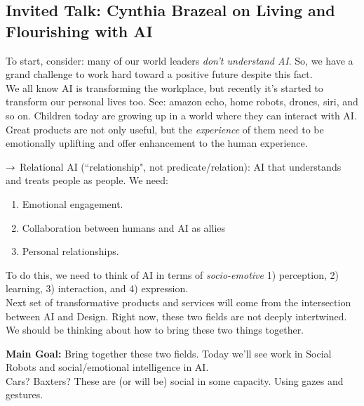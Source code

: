 \spacerule
\subsection{Invited Talk: Cynthia Brazeal on Living and Flourishing with AI}


To start, consider: many of our world leaders {\it don't understand AI}. So, we have a grand challenge to work hard toward a positive future despite this fact. \\

We all know AI is transforming the workplace, but recently it's started to transform our personal lives too. See: amazon echo, home robots, drones, siri, and so on. Children today are growing up in a world where they can interact with AI. \\

Great products are not only useful, but the {\it experience} of them need to be emotionally uplifting and offer enhancement to the human experience. \\


$\rightarrow$ Relational AI (``relationship", not predicate/relation): AI that understands and treats people as people. We need:
\begin{enumerate}
    \item Emotional engagement.
    \item Collaboration between humans and AI as allies
    \item Personal relationships. \\
\end{enumerate}

To do this, we need to think of AI in terms of {\it socio-emotive} 1) perception, 2) learning, 3) interaction, and 4) expression. \\

Next set of transformative products and services will come from the intersection between AI and Design. Right now, these two fields are not deeply intertwined. We should be thinking about how to bring these two things together.

{\bf Main Goal:} Bring together these two fields. Today we'll see work in Social Robots and social/emotional intelligence in AI. \\

Cars? Baxters? These are (or will be) social in some capacity. Using gazes and gestures. \\

